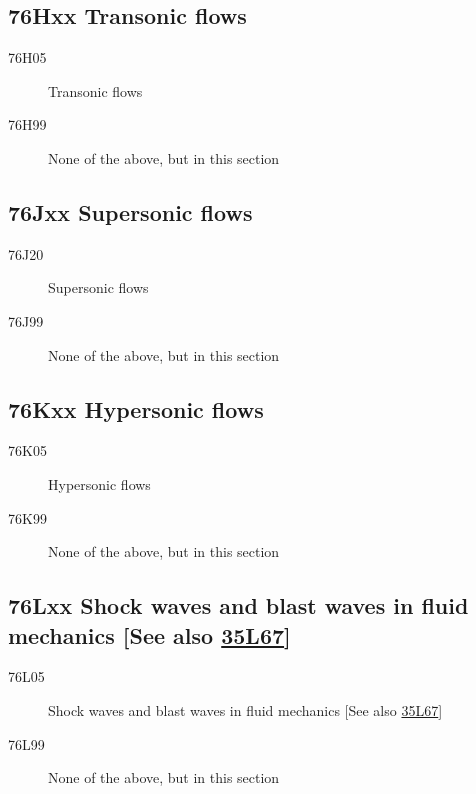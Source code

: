 \documentclass[letterpaper]{article}
\begin{document}
\subsection*{76Hxx  Transonic flows }\label{76Hxx}
\begin{description}  
\item [76H05]\label{76H05} Transonic flows
\item [76H99]\label{76H99} None of the above, but in this section
\end{description}
\subsection*{76Jxx  Supersonic flows }\label{76Jxx}
\begin{description}  
\item [76J20]\label{76J20} Supersonic flows
\item [76J99]\label{76J99} None of the above, but in this section
\end{description}
\subsection*{76Kxx  Hypersonic flows }\label{76Kxx}
\begin{description}  
\item [76K05]\label{76K05} Hypersonic flows
\item [76K99]\label{76K99} None of the above, but in this section
\end{description}
\subsection*{76Lxx  Shock waves and blast waves in fluid mechanics [See also \hyperref[35L67]{35L67}] }\label{76Lxx}
\begin{description}  
\item [76L05]\label{76L05} Shock waves and blast waves in fluid mechanics  [See also \hyperref[35L67]{35L67}]
\item [76L99]\label{76L99} None of the above, but in this section
\end{description}
\end{document}
